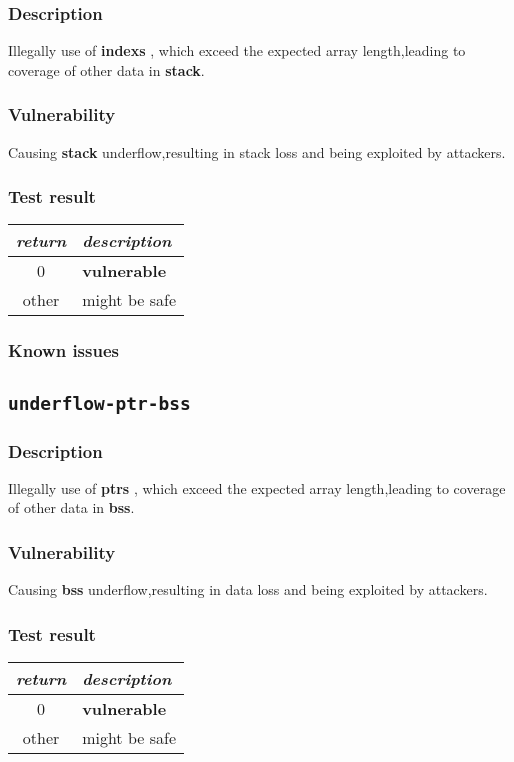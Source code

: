 \documentclass[a4paper]{book}
\begin{document}
\subsubsection{Description}
Illegally use of \textbf{indexs} , which exceed the expected array length,leading to coverage of other data in \textbf{stack}.
\subsubsection{Vulnerability}
Causing \textbf{stack} underflow,resulting in stack loss and being exploited by attackers.
\subsubsection{Test result}
\begin{tabular}{cl}
  \toprule
  \emph{return}  & \emph{description} \\
  \midrule
  0              & \textbf{vulnerable} \\
  other          & might be safe \\
  \bottomrule
\end{tabular}
\subsubsection{Known issues}
\newpage

\subsection{\texttt{underflow-ptr-bss}}\label{test-underflow-ptr-bss}
\subsubsection{Description}
Illegally use of \textbf{ptrs} , which exceed the expected array length,leading to coverage of other data in \textbf{bss}.

\subsubsection{Vulnerability}
Causing \textbf{bss} underflow,resulting in data loss and being exploited by attackers.
\subsubsection{Test result}
\begin{tabular}{cl}
  \toprule
  \emph{return}  & \emph{description} \\
  \midrule
  0              & \textbf{vulnerable} \\
  other          & might be safe \\
  \bottomrule
\end{tabular}
\end{document}
